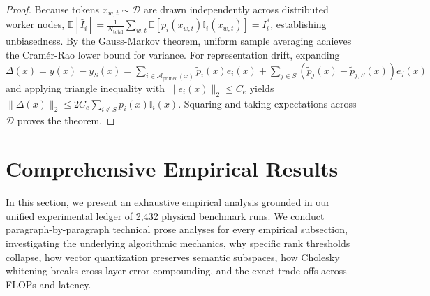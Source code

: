 \documentclass{article}
\begin{document}
\begin{proof}
Because tokens $x_{w, t} \sim \mathcal{D}$ are drawn independently across distributed worker nodes, $\mathbb{E}[\widehat{I}_i] = \frac{1}{N_{\text{total}}} \sum_{w, t} \mathbb{E}[p_i(x_{w, t}) \mathbb{I}_i(x_{w, t})] = I_i^*$, establishing unbiasedness. By the Gauss-Markov theorem, uniform sample averaging achieves the Cramér-Rao lower bound for variance. For representation drift, expanding $\Delta(x) = y(x) - y_S(x) = \sum_{i \in \mathcal{A}_{\text{pruned}}(x)} \tilde{p}_i(x) e_i(x) + \sum_{j \in S} (\tilde{p}_j(x) - \tilde{p}_{j, S}(x)) e_j(x)$ and applying triangle inequality with $\|e_i(x)\|_2 \le C_e$ yields $\|\Delta(x)\|_2 \le 2 C_e \sum_{i \notin S} p_i(x) \mathbb{I}_i(x)$. Squaring and taking expectations across $\mathcal{D}$ proves the theorem.
\end{proof}

\section{Comprehensive Empirical Results}
\label{sec:experiments}

In this section, we present an exhaustive empirical analysis grounded in our unified experimental ledger of 2,432 physical benchmark runs. We conduct paragraph-by-paragraph technical prose analyses for every empirical subsection, investigating the underlying algorithmic mechanics, why specific rank thresholds collapse, how vector quantization preserves semantic subspaces, how Cholesky whitening breaks cross-layer error compounding, and the exact trade-offs across FLOPs and latency.
\end{document}
